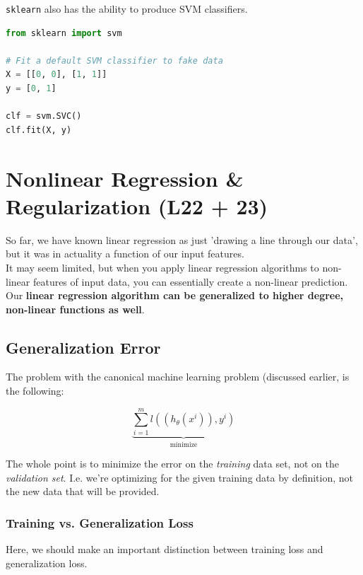 \documentclass[english, 10pt]{article}
\begin{document}
\texttt{sklearn} also has the ability to produce SVM classifiers.\\


{\centering
\begin{lstlisting}[language=python]
from sklearn import svm

# Fit a default SVM classifier to fake data
X = [[0, 0], [1, 1]]
y = [0, 1]

clf = svm.SVC()
clf.fit(X, y)
\end{lstlisting}
}

\section{Nonlinear Regression \& Regularization (L22 + 23)}

So far, we have known linear regression as just 'drawing a line through our data', but it was in actuality a function of our input features.\\

It may seem limited, but when you apply linear regression algorithms to non-linear features of input data, you can essentially create a non-linear prediction.\\

Our \textbf{linear regression algorithm can be generalized to higher degree, non-linear functions as well}.

\subsection{Generalization Error}

The problem with the canonical machine learning problem (discussed earlier, is the following:

$$ \underbrace{\sum_{i=1}^{m}{l((h_{\theta}(x^i)), y^i)}}_{\mathrm{minimize}}$$

The whole point is to minimize the error on the \textit{training} data set, not on the \textit{validation set}. I.e. we're optimizing for the given training data by definition, not the new data that will be provided.\\

\subsubsection{Training vs. Generalization Loss}

Here, we should make an important distinction between training loss and generalization loss.\\
\end{document}
